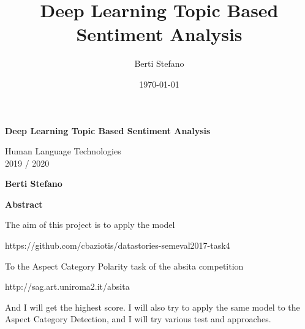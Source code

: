 \documentclass{article}
\title{Deep Learning Topic Based Sentiment Analysis}
\author{Berti Stefano}
\date{\today}
\begin{document}
    \thispagestyle{plain}
    \begin{center}
        \Large
        \textbf{Deep Learning Topic Based Sentiment Analysis}

        \vspace{0.4cm}
        \large Human Language Technologies
        \\2019 / 2020

        \vspace{0.4cm}
        \textbf{Berti Stefano}

        \vspace{0.9cm}
        \textbf{Abstract}
    \end{center}
    The aim of this project is to apply the model
    \\\centerline{https://github.com/cbaziotis/datastories-semeval2017-task4}
    To the Aspect Category Polarity task of the absita competition
    \\\centerline{http://sag.art.uniroma2.it/absita}
    And I will get the highest score.
    I will also try to apply the same model to the Aspect Category Detection, and I will try various test and approaches.
\end{document}
